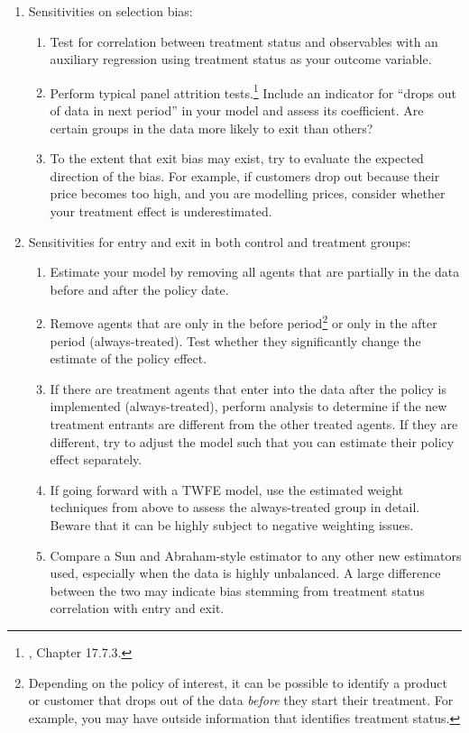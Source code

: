 \documentclass[12pt]{article}
\begin{document}
\begin{enumerate}
    \item Sensitivities on selection bias:
    \begin{enumerate}
        \item Test for correlation between treatment status and observables with an auxiliary regression using treatment status as your outcome variable.
        \item Perform typical panel attrition tests.\footnote{\citet{wooldridge2010a}, Chapter 17.7.3.}  Include an indicator for “drops out of data in next period” in your model and assess its coefficient. Are certain groups in the data more likely to exit than others?
        \item To the extent that exit bias may exist, try to evaluate the expected direction of the bias. For example, if customers drop out because their price becomes too high, and you are modelling prices, consider whether your treatment effect is underestimated.
    \end{enumerate}
    \item Sensitivities for entry and exit in both control and treatment groups:
    \begin{enumerate}
        \item Estimate your model by removing all agents that are partially in the data before and after the policy date.
        \item Remove agents that are only in the before period\footnote{Depending on the policy of interest, it can be possible to identify a product or customer that drops out of the data \textit{before} they start their treatment. For example, you may have outside information that identifies treatment status.} or only in the after period (always-treated). Test whether they significantly change the estimate of the policy effect.
        \item If there are treatment agents that enter into the data after the policy is implemented (always-treated), perform analysis to determine if the new treatment entrants are different from the other treated agents. If they are different, try to adjust the model such that you can estimate their policy effect separately.
        \item If going forward with a TWFE model, use the estimated weight techniques from above to assess the always-treated group in detail. Beware that it can be highly subject to negative weighting issues.
        \item Compare a Sun and Abraham-style estimator to any other new estimators used, especially when the data is highly unbalanced. A large difference between the two may indicate bias stemming from treatment status correlation with entry and exit.
    \end{enumerate}
\end{enumerate}
\newpage
\end{document}
